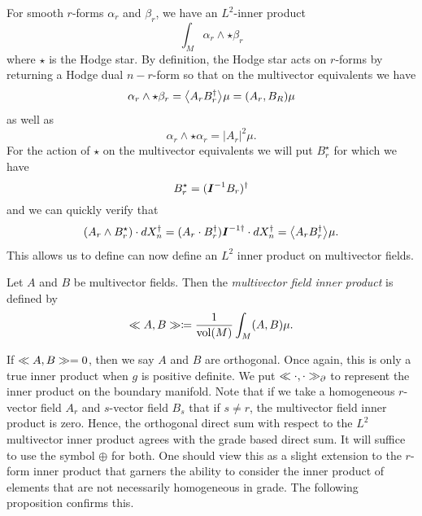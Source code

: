 For smooth $r$-forms $\alpha_r$ and $\beta_r$, we have an $L^2$-inner product 
\begin{equation}
\int_M \alpha_r \wedge \star \beta_r 
\end{equation}
where $\star$ is the Hodge star. By definition, the Hodge star acts on $r$-forms by returning a Hodge dual $n-r$-form so that on the multivector equivalents we have
\begin{equation}
\alpha_r \wedge \star \beta_r  = \proj{}{A_r B_r^\dagger}\mu = (A_r,B_R)\mu
\end{equation}
as well as
\begin{equation}
    \alpha_r \wedge \star \alpha_r = |A_r|^2\mu.
\end{equation}
For the action of $\star$ on the multivector equivalents we will put $B_r^\star$ for which we have
\begin{equation}
B_r^\star = (\boldsymbol{I}^{-1} B_r)^\dagger
\end{equation}
and we can quickly verify that
\begin{align}
(A_r \wedge B_r^\star)\cdot dX_n^\dagger = (A_r\cdot B_r^\dagger) \pseudoscalar^{-1 \dagger}\cdot dX_n^\dagger = \proj{}{A_rB_r^\dagger}\mu.
\end{align}
This allows us to define can now define an $L^2$ inner product on multivector fields.
\begin{definition}
\label{def:multivector_field_inner_product}
Let $A$ and $B$ be multivector fields. Then the \emph{multivector field inner product} is defined by
\begin{equation}
\ll A, B\gg \coloneqq \frac{1}{\operatorname{vol}(M)} \int_M (A,B) \mu.
\end{equation}
\end{definition}
If $\ll A, B\gg = 0$, then we say $A$ and $B$ are orthogonal. Once again, this is only a true inner product when $g$ is positive definite.  We put $\ll \cdot, \cdot\gg_\partial$ to represent the inner product on the boundary manifold. Note that if we take a homogeneous $r$-vector field $A_r$ and $s$-vector field $B_s$ that if $s\neq r$, the multivector field inner product is zero. Hence, the orthogonal direct sum with respect to the $L^2$ multivector inner product agrees with the grade based direct sum. It will suffice to use the symbol $\oplus$ for both. One should view this as a slight extension to the $r$-form inner product that garners the ability to consider the inner product of elements that are not necessarily homogeneous in grade. The following proposition confirms this.
